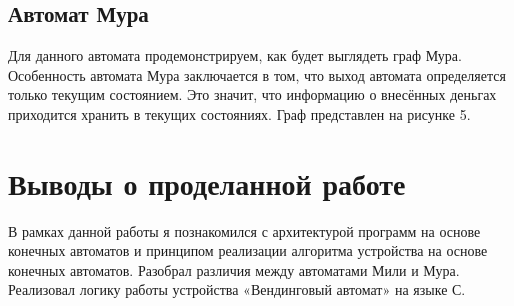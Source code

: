 \subsection{Автомат Мура}
Для данного автомата продемонстрируем, как будет выглядеть граф Мура. Особенность автомата Мура заключается в том, что выход автомата определяется только текущим состоянием. Это значит, что информацию о внесённых деньгах приходится хранить в текущих состояниях. Граф представлен на рисунке 5.

\FloatBarrier

\section{Выводы о проделанной работе}
В рамках данной работы я познакомился с архитектурой программ на основе конечных автоматов и принципом реализации алгоритма устройства на основе конечных автоматов. Разобрал различия между автоматами Мили и Мура. Реализовал логику работы устройства «Вендинговый автомат» на языке С.
